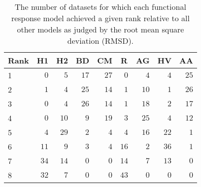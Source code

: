 \begin{table}[!tbp]
\caption{The number of datasets for which each functional response model achieved a given rank relative to all other models as judged by the root mean square deviation (RMSD).\label{table:RMSD_rankings}} 
\begin{center}
\begin{tabular}{lrrrrrrrr}
\hline\hline
\multicolumn{1}{l}{Rank}&\multicolumn{1}{c}{H1}&\multicolumn{1}{c}{H2}&\multicolumn{1}{c}{BD}&\multicolumn{1}{c}{CM}&\multicolumn{1}{c}{R}&\multicolumn{1}{c}{AG}&\multicolumn{1}{c}{HV}&\multicolumn{1}{c}{AA}\tabularnewline
\hline
1&$ 0$&$ 5$&$17$&$27$&$ 0$&$ 4$&$ 4$&$25$\tabularnewline
2&$ 1$&$ 4$&$25$&$14$&$ 1$&$10$&$ 1$&$26$\tabularnewline
3&$ 0$&$ 4$&$26$&$14$&$ 1$&$18$&$ 2$&$17$\tabularnewline
4&$ 0$&$10$&$ 9$&$19$&$ 3$&$25$&$ 4$&$12$\tabularnewline
5&$ 4$&$29$&$ 2$&$ 4$&$ 4$&$16$&$22$&$ 1$\tabularnewline
6&$11$&$ 9$&$ 3$&$ 4$&$16$&$ 2$&$36$&$ 1$\tabularnewline
7&$34$&$14$&$ 0$&$ 0$&$14$&$ 7$&$13$&$ 0$\tabularnewline
8&$32$&$ 7$&$ 0$&$ 0$&$43$&$ 0$&$ 0$&$ 0$\tabularnewline
\hline
\end{tabular}\end{center}
\end{table}
